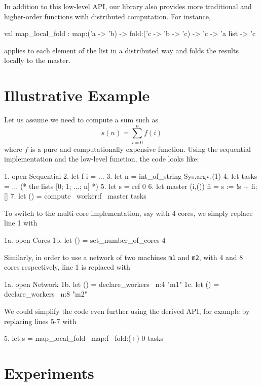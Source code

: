 \documentclass[preprint]{sigplanconf}
\begin{document}
In addition to this low-level API, our library also provides more
traditional  and  higher-order functions with
distributed computation. For instance, 
\begin{ocaml}
  val map_local_fold : 
    map:('a -> 'b) -> fold:('c -> 'b -> 'c) -> 
    'c -> 'a list -> 'c 
\end{ocaml}
applies  to each element of the list in a distributed way and
folds the results locally to the master. 

\section{Illustrative Example}\label{sec:example}

Let us assume we need to compute a sum such as
\begin{displaymath}
  s(n) = \sum_{i=0}^{n}f(i)
\end{displaymath}
where $f$ is a pure and computationally expensive function.
Using the sequential implementation and the low-level 
function, the code looks like:
\begin{ocaml}
1.  open Sequential
2.  let f i = ...
3.  let n = int_of_string Sys.argv.(1)
4.  let tasks = ... (* the lists [0; 1; ...; n] *)
5.  let s = ref 0
6.  let master (i,()) fi = s := !s + fi; []
7.  let () = compute ~worker:f ~master tasks
\end{ocaml}
To switch to the multi-core implementation, say with 4 cores, we
simply replace line 1 with
\begin{ocaml}
1a.  open Cores
1b.  let () = set_number_of_cores 4
\end{ocaml}
Similarly, in order to use a network of two machines \texttt{m1} and
\texttt{m2}, with 4 and 8 cores respectively, line 1 is replaced with
\begin{ocaml}
1a.  open Network
1b.  let () = declare_workers ~n:4 "m1"
1c.  let () = declare_workers ~n:8 "m2"
\end{ocaml}

We could simplify the code even further using the derived API, for
example by replacing lines 5-7 with
\begin{ocaml}
5.  let s = map_local_fold ~map:f ~fold:(+) 0 tasks
\end{ocaml}


\section{Experiments}\label{sec:experiments}
\end{document}
